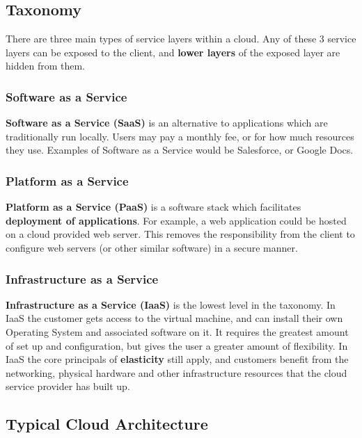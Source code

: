 \documentclass{article}
\begin{document}
\subsection{Taxonomy}

There are three main types of service layers within a cloud. Any of these 3 service layers can be exposed to the client, and \textbf{lower layers} of the exposed layer are hidden from them.

\subsubsection{Software as a Service}

\textbf{Software as a Service (SaaS)} is an alternative to applications which are traditionally run locally. Users may pay a monthly fee, or for how much resources they use. Examples of Software as a Service would be Salesforce, or Google Docs.

\subsubsection{Platform as a Service}

\textbf{Platform as a Service (PaaS)} is a software stack which facilitates \textbf{deployment of applications}. For example, a web application could be hosted on a cloud provided web server. This removes the responsibility from the client to configure web servers (or other similar software) in a secure manner.

\subsubsection{Infrastructure as a Service}

\textbf{Infrastructure as a Service (IaaS)} is the lowest level in the taxonomy. In IaaS the customer gets access to the virtual machine, and can install their own Operating System and associated software on it. It requires the greatest amount of set up and configuration, but gives the user a greater amount of flexibility. In IaaS the core principals of \textbf{elasticity} still apply, and customers benefit from the networking, physical hardware and other infrastructure resources that the cloud service provider has built up. 

\subsection{Typical Cloud Architecture}
\end{document}
